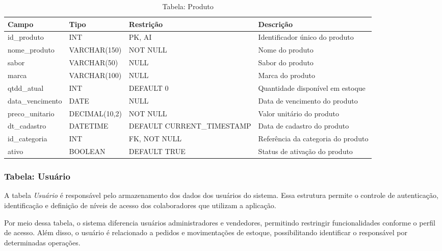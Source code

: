 \begin{table}[H]
\centering
\begin{tabular}{|p{3cm}|p{3cm}|p{3cm}|p{5cm}|}
\hline
\textbf{Campo} & \textbf{Tipo} & \textbf{Restrição} & \textbf{Descrição} \\ \hline
id\_produto & INT & PK, AI & Identificador único do produto \\ \hline
nome\_produto & VARCHAR(150) & NOT NULL & Nome do produto \\ \hline
sabor & VARCHAR(50) & NULL & Sabor do produto \\ \hline
marca & VARCHAR(100) & NULL & Marca do produto \\ \hline
qtdd\_atual & INT & DEFAULT 0 & Quantidade disponível em estoque \\ \hline
data\_vencimento & DATE & NULL & Data de vencimento do produto \\ \hline
preco\_unitario & DECIMAL(10,2) & NOT NULL & Valor unitário do produto \\ \hline
dt\_cadastro & DATETIME & DEFAULT CURRENT\_TIMESTAMP & Data de cadastro do produto \\ \hline
id\_categoria & INT & FK, NOT NULL & Referência da categoria do produto \\ \hline
ativo & BOOLEAN & DEFAULT TRUE & Status de ativação do produto \\ \hline
\end{tabular}
\caption{Tabela: Produto}
\end{table}

\subsubsection{Tabela: Usuário}

A tabela \textit{Usuário} é responsável pelo armazenamento dos dados dos usuários do sistema. Essa estrutura permite o controle de autenticação, identificação e definição de níveis de acesso dos colaboradores que utilizam a aplicação.

Por meio dessa tabela, o sistema diferencia usuários administradores e vendedores, permitindo restringir funcionalidades conforme o perfil de acesso. Além disso, o usuário é relacionado a pedidos e movimentações de estoque, possibilitando identificar o responsável por determinadas operações.

